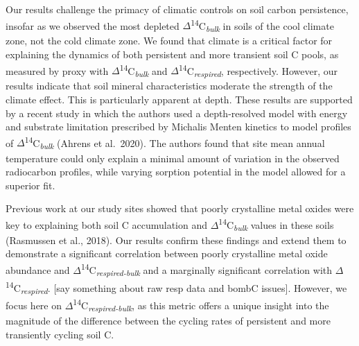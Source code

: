 \documentclass[english,man,floatsintext]{apa6}
\begin{document}
Our results challenge the primacy of climatic controls on soil carbon persistence, insofar as we observed the most depleted \(\Delta\)\textsuperscript{14}C\textsubscript{\emph{bulk}} in soils of the cool climate zone, not the cold climate zone. We found that climate is a critical factor for explaining the dynamics of both persistent and more transient soil C pools, as measured by proxy with \(\Delta\)\textsuperscript{14}C\textsubscript{\emph{bulk}} and \(\Delta\)\textsuperscript{14}C\textsubscript{\emph{respired}}, respectively. However, our results indicate that soil mineral characteristics moderate the strength of the climate effect. This is particularly apparent at depth. These results are supported by a recent study in which the authors used a depth-resolved model with energy and substrate limitation prescribed by Michalis Menten kinetics to model profiles of \(\Delta\)\textsuperscript{14}C\textsubscript{\emph{bulk}} (Ahrens et al.~2020). The authors found that site mean annual temperature could only explain a minimal amount of variation in the observed radiocarbon profiles, while varying sorption potential in the model allowed for a superior fit.

Previous work at our study sites showed that poorly crystalline metal oxides were key to explaining both soil C accumulation and \(\Delta\)\textsuperscript{14}C\textsubscript{\emph{bulk}} values in these soils (Rasmussen et al., 2018). Our results confirm these findings and extend them to demonstrate a significant correlation between poorly crystalline metal oxide abundance and \(\Delta\)\textsuperscript{14}C\textsubscript{\emph{respired-bulk}} and a marginally significant correlation with \(\Delta\)\textsuperscript{14}C\textsubscript{\emph{respired}}. {[}say something about raw resp data and bombC issues{]}. However, we focus here on \(\Delta\)\textsuperscript{14}C\textsubscript{\emph{respired-bulk}}, as this metric offers a unique insight into the magnitude of the difference between the cycling rates of persistent and more transiently cycling soil C.
\end{document}
